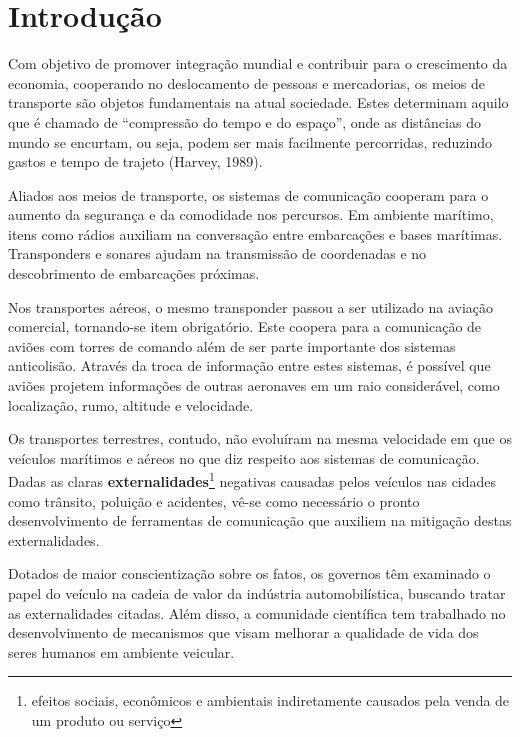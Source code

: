 \documentclass[
12pt,				%
openright,			%
oneside,			%
a4paper,			%
brazil,				%
]{abntex2}
\begin{document}
	\chapter[Introdução]{Introdução}

	
	\par Com objetivo de promover integração mundial e contribuir para o crescimento da economia, cooperando no deslocamento de pessoas e mercadorias, os meios de transporte são objetos fundamentais na atual sociedade. Estes determinam aquilo que é chamado de “compressão do tempo e do espaço”, onde as distâncias do mundo se encurtam, ou seja, podem ser mais facilmente percorridas, reduzindo gastos e tempo de trajeto (Harvey, 1989).
	
	\par Aliados aos meios de transporte, os sistemas de comunicação cooperam para o aumento da segurança e da comodidade nos percursos. Em ambiente marítimo, itens como rádios auxiliam na conversação entre embarcações e bases marítimas. Transponders e sonares ajudam na transmissão de coordenadas e no descobrimento de embarcações próximas. 
	
	\par Nos transportes aéreos, o mesmo transponder passou a ser utilizado na aviação comercial, tornando-se item obrigatório. Este coopera para a comunicação de aviões com torres de comando além de ser parte importante dos sistemas anticolisão. Através da troca de informação entre estes sistemas, é possível que aviões projetem informações de outras aeronaves em um raio considerável, como localização, rumo, altitude e velocidade.
	
	\par Os transportes terrestres, contudo, não evoluíram na mesma velocidade em que os veículos marítimos e aéreos no que diz respeito aos sistemas de comunicação. Dadas as claras \textbf{externalidades}{\footnote{efeitos sociais, econômicos e ambientais indiretamente causados pela venda de um produto ou serviço}} negativas causadas pelos veículos nas cidades como trânsito, poluição e acidentes, vê-se como necessário o pronto desenvolvimento de ferramentas de comunicação que auxiliem na mitigação destas externalidades.

	\par Dotados de maior conscientização sobre os fatos, os governos têm examinado o papel do veículo na cadeia de valor da indústria automobilística, buscando tratar as externalidades citadas. Além disso, a comunidade científica tem trabalhado no desenvolvimento de mecanismos que visam melhorar a qualidade de vida dos seres humanos em ambiente veicular. 
	
\end{document}
